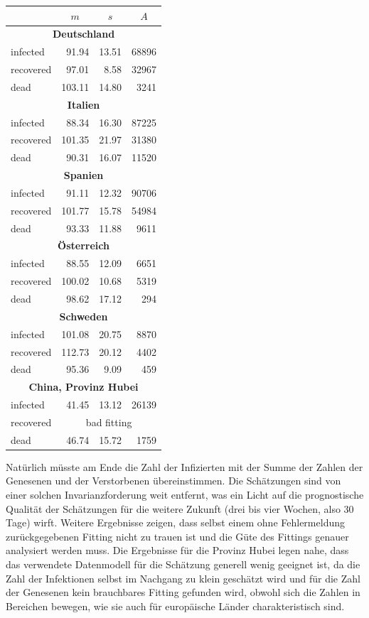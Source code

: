 \documentclass[a4paper,11pt]{article}
\begin{document}
\begin{center}
  \begin{tabular}{|l|r|r|r|}\hline
    & \multicolumn{1}{|c|}{$m$} & \multicolumn{1}{|c|}{$s$}
    & \multicolumn{1}{|c|}{$A$} \\\hline
    \multicolumn{4}{|c|}{\bf Deutschland}\\\hline
    infected   & 91.94 & 13.51 &  68896\\
    recovered  & 97.01 &  8.58 &  32967\\
    dead       &103.11 & 14.80 &   3241\\\hline
    \multicolumn{4}{|c|}{\bf Italien}\\\hline
    infected   & 88.34 & 16.30 &  87225\\
    recovered  &101.35 & 21.97 &  31380\\
    dead       & 90.31 & 16.07 &  11520\\\hline
    \multicolumn{4}{|c|}{\bf Spanien}\\\hline
    infected   & 91.11 & 12.32 &  90706\\
    recovered  &101.77 & 15.78 &  54984\\
    dead       & 93.33 & 11.88 &   9611\\\hline
    \multicolumn{4}{|c|}{\bf Österreich}\\\hline
    infected   & 88.55 & 12.09 &   6651\\
    recovered  &100.02 & 10.68 &   5319\\
    dead       & 98.62 & 17.12 &    294\\\hline
    \multicolumn{4}{|c|}{\bf Schweden}\\\hline
    infected   &101.08 & 20.75 &   8870\\
    recovered  &112.73 & 20.12 &   4402\\
    dead       & 95.36 &  9.09 &    459\\\hline
    \multicolumn{4}{|c|}{\bf China, Provinz Hubei}\\\hline
    infected   & 41.45 & 13.12 &  26139\\
    recovered  & \multicolumn{3}{|c|}{bad fitting}\\
    dead       & 46.74 & 15.72 &   1759\\\hline
  \end{tabular}
\end{center}
Natürlich müsste am Ende die Zahl der Infizierten mit der Summe der Zahlen der
Genesenen und der Verstorbenen übereinstimmen.  Die Schätzungen sind von einer
solchen Invarianzforderung weit entfernt, was ein Licht auf die prognostische
Qualität der Schätzungen für die weitere Zukunft (drei bis vier Wochen, also
30 Tage) wirft.  Weitere Ergebnisse zeigen, dass selbst einem ohne
Fehlermeldung zurückgegebenen Fitting nicht zu trauen ist und die Güte des
Fittings genauer analysiert werden muss.  Die Ergebnisse für die Provinz Hubei
legen nahe, dass das verwendete Datenmodell für die Schätzung generell wenig
geeignet ist, da die Zahl der Infektionen selbst im Nachgang zu klein
geschätzt wird und für die Zahl der Genesenen kein brauchbares Fitting
gefunden wird, obwohl sich die Zahlen in Bereichen bewegen, wie sie auch für
europäische Länder charakteristisch sind.
\end{document}
